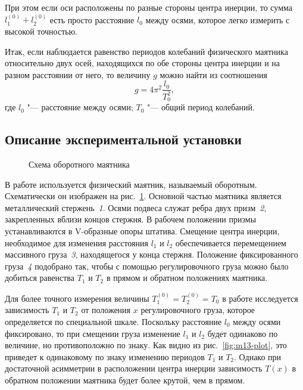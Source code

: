 \documentclass[a4paper, 12pt]{extarticle}
\begin{document}
При этом если оси расположены по разные стороны центра инерции, то сумма $l_1^{(0)} +l_2^{(0)}$ есть просто расстояние $l_0$ между осями, которое легко измерить с высокой точностью.

Итак, если наблюдается равенство периодов колебаний физического маятника относительно двух осей, находящихся по обе стороны центра инерции и на разном расстоянии от него, то величину $g$ можно найти из соотношения 
\begin{equation}
\label{eq:m13-g-3}
g = 4 \pi^2 \frac{l_0}{T_0^2},
\end{equation}
где $l_0$  "--- расстояние между осями; $T_0$ "--- общий период колебаний.

\subsection{Описание экспериментальной установки}

\begin{figure}[h]
\begin{center}
\end{center}
\caption{Схема оборотного маятника \label{fig:m13-pendulum}}
\end{figure}

В работе используется физический маятник, называемый оборотным. Схематически он изображен на рис.~\ref{fig:m13-pendulum}. Основной частью маятника является металлический стержень~\emph{1}. Осями подвеса служат ребра двух призм~\emph{2}, закрепленных вблизи концов стержня. В рабочем положении призмы устанавливаются в V-образные опоры штатива. %
Смещение центра инерции, необходимое для изменения расстояния $l_1$ и $l_2$  обеспечивается перемещением массивного груза~\emph{3}, находящегося у конца стержня. Положение фиксированного груза~\emph{4} подобрано так, чтобы с помощью регулировочного груза можно было добиться равенства $T_1$ и $T_2$ в прямом и обратном положениях маятника.

Для более точного измерения величины $T_1^{(0)} = T_2^{(0)} = T_0$ в работе исследуется зависимость $T_1$ и $T_2$ от положения $x$ регулировочного груза, которое определяется по специальной шкале. Поскольку расстояние $l_0$ между осями фиксировано, то при смещении груза изменение $l_1$ и $l_2$ будет одинаково по величине, но противоположно по знаку. Как видно из рис.~\ref{fig:m13-plot}, это приведет к одинаковому по знаку изменению периодов $T_1$ и $T_2$. Однако при достаточной асимметрии в расположении центра инерции зависимость $T(x)$ в обратном положении маятника будет более крутой, чем в прямом.
\end{document}
